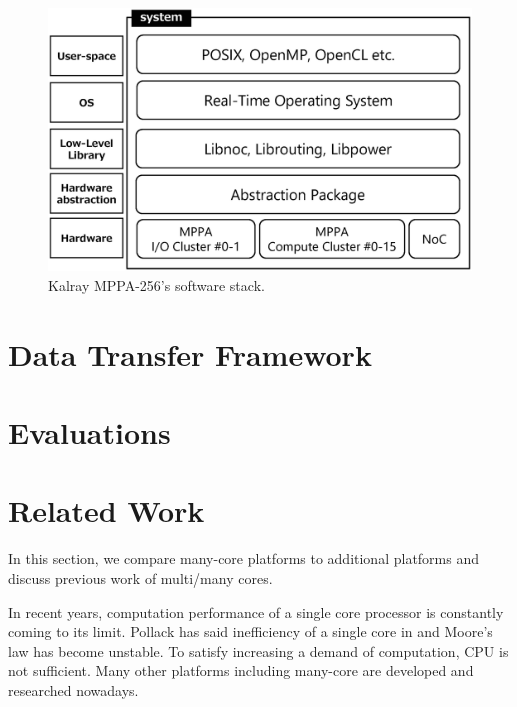 \documentclass{sig-alternate-05-2015}
\begin{document}
\begin{figure}[t]
  \centering
  \includegraphics[width=1.0\linewidth]{../figure/softwarestack.eps}
  \caption{\label{fig:software_stack}
    Kalray MPPA-256's software stack.}
\end{figure}


\section{Data Transfer Framework}
\label{sec:framework}


\section{Evaluations}
\label{sec:evaluations}


\section{Related Work}
\label{sec:related work}
In this section, we compare many-core platforms to additional platforms and discuss previous work of multi/many cores.

In recent years, computation performance of a single core processor is constantly coming to its limit.
Pollack has said inefficiency of a single core in \cite{pollack1999new} and Moore's law \cite{moore2006cramming} has become unstable.
To satisfy increasing a demand of computation, CPU is not sufficient.
Many other platforms including many-core are developed and researched nowadays.
\end{document}
